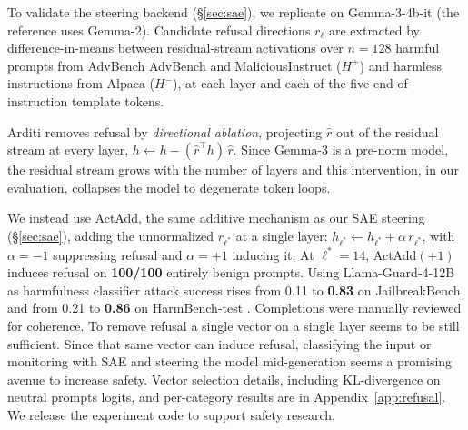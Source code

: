 \documentclass[11pt]{article}
\begin{document}
To validate the steering backend (\S\ref{sec:sae}), we replicate
\citet{arditi2024refusallanguagemodelsmediated} on Gemma-3-4b-it (the reference uses Gemma-2). Candidate refusal directions $r_\ell$ are extracted by difference-in-means between residual-stream activations over $n{=}128$ harmful prompts from AdvBench AdvBench\cite{zou2023universaltransferableadversarialattacks} and MaliciousInstruct \cite{ICLR2024_3af25aa3} ($H^{+}$) and harmless instructions from Alpaca \cite{taori2023alpaca} ($H^{-}$), at each layer and each of the five end-of-instruction template tokens.

 Arditi removes refusal by \emph{directional ablation}, projecting $\hat r$ out of the residual stream at every layer, $h \leftarrow h - (\hat r^{\top}h)\,\hat r$. Since Gemma-3 is a pre-norm model, the residual stream grows with the number of layers \cite{hex2023residual} and this intervention, in our evaluation, collapses the model to degenerate token loops. 



%


We instead use ActAdd, the same additive mechanism as our SAE steering (\S\ref{sec:sae}), adding the unnormalized $r_{\ell^{*}}$ at a single layer: $h_{\ell^{*}} \leftarrow h_{\ell^{*}} + \alpha\,r_{\ell^{*}}$, with $\alpha=-1$ suppressing refusal and $\alpha=+1$ inducing it. At
$\ell^{*}=14$, ActAdd$(+1)$ induces refusal on \textbf{100/100} entirely benign prompts. Using Llama-Guard-4-12B \cite{inan2023llamaguardllmbasedinputoutput} as harmfulness classifier attack success rises from 0.11 to \textbf{0.83} on JailbreakBench \cite{chao2024jailbreakbench} and from 0.21 to \textbf{0.86} on HarmBench-test \cite{mazeika2024harmbenchstandardizedevaluationframework}. Completions were manually reviewed for coherence. To remove refusal a single vector on a single layer seems to be still sufficient. Since that same vector can induce refusal, classifying the input or monitoring with SAE \cite{deng2026qwenscopeturningsparsefeatures} and steering the model mid-generation seems a promising avenue to increase safety. Vector selection details, including KL-divergence on neutral prompts logits, and per-category
results are in Appendix~\ref{app:refusal}. We release the experiment code to support safety research.
\end{document}
